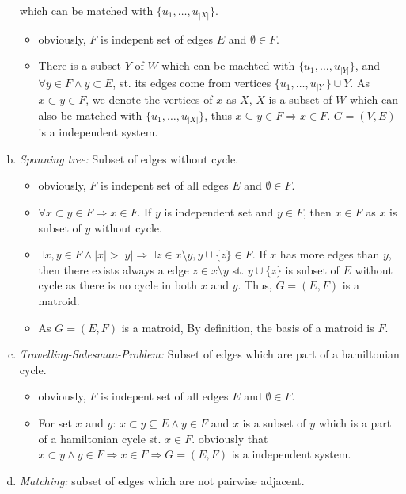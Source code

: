 \documentclass[12pt]{article}
\theoremstyle{definition}
\begin{document}
\begin{flushleft}
\begin{enumerate}[(a)]
    which can be matched with $\{u_1, \ldots, u_{|X|}\}$.
    \begin{itemize}
        \item obviously, $F$ is indepent set of edges $E$ and $\emptyset \in F$.
        \item There is a subset $Y$ of $W$ which can be machted with $\{u_1,\ldots,u_{|Y|}\}$, and $\forall y \in F \land y \subset E$, st.
        its edges come from vertices $\{u_1,\ldots,u_{|Y|}\} \cup Y$. As $ x \subset y \in F$, we denote the vertices of $x$ as $X$,
        $X$ is a subset of $W$ which can also be matched with $\{u_1, \ldots, u_{|X|}\}$, thus $ x \subseteq y \in F \Longrightarrow x \in F$.
        $G = (V,E)$ is a independent system.
    \end{itemize}
    \item \textit{Spanning tree:} Subset of edges without cycle.
    \begin{itemize}
        \item obviously, $F$ is indepent set of all edges $E$ and $\emptyset \in F$.
        \item $\forall x \subset y \in F \Longrightarrow x \in F$. If $y$ is independent set and $y \in F$, then $x \in F$
        as $x$ is subset of $y$ without cycle.
        \item $\exists x, y \in F \land |x| > |y| \Longrightarrow \exists z \in x \setminus y, y \cup \{z\} \in F$.
        If $x$ has more edges than $y$, then there exists always a edge $z \in x \setminus y$ st. $y \cup \{z\}$ is subset of $E$ without cycle
        as there is no cycle in both $x$ and $y$. Thus, $ G = (E, F)$ is a matroid.
        \item As $G = (E,F)$ is a matroid, By definition, the basis of a matroid is $F$.
    \end{itemize}
    \item \textit{Travelling-Salesman-Problem:} Subset of edges which are part of a hamiltonian cycle.
    \begin{itemize}
        \item obviously, $F$ is indepent set of all edges $E$ and $\emptyset \in F$.
        \item For set $x$ and $y$: $x \subset y \subseteq E \land y \in F$ 
        and $x$ is a subset of $y$ which is a part of a hamiltonian cycle st. $x \in F$. obviously that 
        $x \subset y \land y \in F \Longrightarrow x \in F \Longrightarrow G = (E, F)$ is a independent system.
    \end{itemize}
    \item \textit{Matching:} subset of edges which are not pairwise adjacent.

\end{enumerate}
\end{flushleft}
\end{document}
